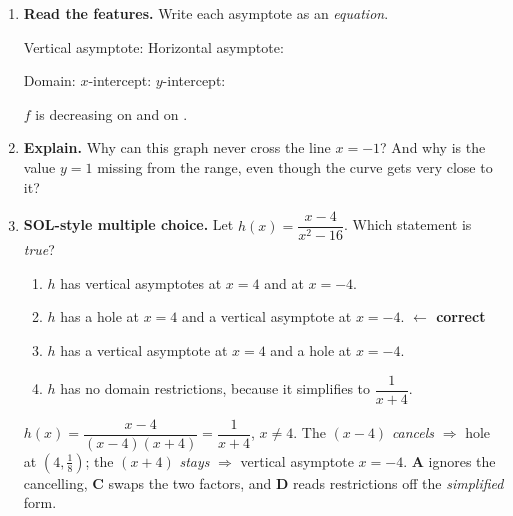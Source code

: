 \documentclass[10pt]{article}
\begin{document}
\begin{enumerate}[leftmargin=1.8em, itemsep=8pt]
  \item \textbf{Read the features.} Write each asymptote as an \emph{equation}.

        Vertical asymptote:  \quad Horizontal asymptote: 

        \vspace{3pt}
        Domain:  \quad $x$-intercept:  \quad
        $y$-intercept: 

        \vspace{3pt}
        $f$ is decreasing on  and on .

  \item \textbf{Explain.} Why can this graph never cross the line $x=-1$? And why is the value $y=1$
        missing from the range, even though the curve gets very close to it?

  \item \textbf{SOL-style multiple choice.} Let $h(x) = \dfrac{x-4}{x^2-16}$. Which statement is
        \emph{true}?
        \begin{enumerate}[label=\Alph*., leftmargin=1.9em, itemsep=1pt]
          \item $h$ has vertical asymptotes at $x=4$ and at $x=-4$.
          \item $h$ has a hole at $x=4$ and a vertical asymptote at $x=-4$.
                \quad \textcolor{keyred}{\textbf{$\leftarrow$ correct}}
          \item $h$ has a vertical asymptote at $x=4$ and a hole at $x=-4$.
          \item $h$ has no domain restrictions, because it simplifies to $\dfrac{1}{x+4}$.
        \end{enumerate}
        \vspace{2pt}
        {\small $h(x)=\dfrac{x-4}{(x-4)(x+4)}=\dfrac{1}{x+4}$, $x\neq 4$. The $(x-4)$ \emph{cancels}
        $\Rightarrow$ hole at $\left(4,\tfrac18\right)$; the $(x+4)$ \emph{stays} $\Rightarrow$
        vertical asymptote $x=-4$. \textbf{A} ignores the cancelling, \textbf{C} swaps the two
        factors, and \textbf{D} reads restrictions off the \emph{simplified} form.}
\end{enumerate}
\end{document}
